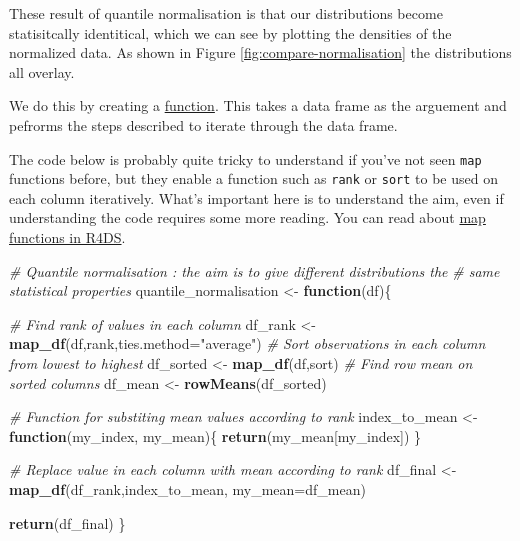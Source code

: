 \documentclass[12pt,]{book}
\newenvironment{Shaded}{\begin{snugshade}}{\end{snugshade}}
\newcommand{\CommentTok}[1]{\textcolor[rgb]{0.56,0.35,0.01}{\textit{#1}}}
\newcommand{\ControlFlowTok}[1]{\textcolor[rgb]{0.13,0.29,0.53}{\textbf{#1}}}
\newcommand{\DataTypeTok}[1]{\textcolor[rgb]{0.13,0.29,0.53}{#1}}
\newcommand{\KeywordTok}[1]{\textcolor[rgb]{0.13,0.29,0.53}{\textbf{#1}}}
\newcommand{\NormalTok}[1]{#1}
\newcommand{\StringTok}[1]{\textcolor[rgb]{0.31,0.60,0.02}{#1}}
\begin{document}
These result of quantile normalisation is that our distributions become
statisitcally identitical, which we can see by plotting the densities of the
normalized data. As shown in Figure \ref{fig:compare-normalisation} the distributions
all overlay.

We do this by creating a \protect\hyperlink{function-anatomy}{function}. This takes a data
frame as the arguement and pefrorms the steps described to iterate through
the data frame.

The code below is probably quite tricky to understand if
you've not seen \texttt{map} functions before, but they enable a function such as \texttt{rank}
or \texttt{sort} to be used on each column iteratively. What's important here is
to understand the aim, even if understanding the code requires some more reading.
You can read about \href{http://r4ds.had.co.nz/iteration.html\#the-map-functions}{map functions in R4DS}.

\begin{Shaded}
\begin{Highlighting}[]
\CommentTok{# Quantile normalisation : the aim is to give different distributions the}
\CommentTok{# same statistical properties}
\NormalTok{quantile_normalisation <-}\StringTok{ }\ControlFlowTok{function}\NormalTok{(df)\{}
  
  \CommentTok{# Find rank of values in each column}
\NormalTok{  df_rank <-}\StringTok{ }\KeywordTok{map_df}\NormalTok{(df,rank,}\DataTypeTok{ties.method=}\StringTok{"average"}\NormalTok{)}
  \CommentTok{# Sort observations in each column from lowest to highest }
\NormalTok{  df_sorted <-}\StringTok{ }\KeywordTok{map_df}\NormalTok{(df,sort)}
  \CommentTok{# Find row mean on sorted columns}
\NormalTok{  df_mean <-}\StringTok{ }\KeywordTok{rowMeans}\NormalTok{(df_sorted)}
  
  \CommentTok{# Function for substiting mean values according to rank }
\NormalTok{  index_to_mean <-}\StringTok{ }\ControlFlowTok{function}\NormalTok{(my_index, my_mean)\{}
    \KeywordTok{return}\NormalTok{(my_mean[my_index])}
\NormalTok{  \}}
  
  \CommentTok{# Replace value in each column with mean according to rank }
\NormalTok{  df_final <-}\StringTok{ }\KeywordTok{map_df}\NormalTok{(df_rank,index_to_mean, }\DataTypeTok{my_mean=}\NormalTok{df_mean)}
  
  \KeywordTok{return}\NormalTok{(df_final)}
\NormalTok{\}}
\end{Highlighting}
\end{Shaded}
\end{document}
